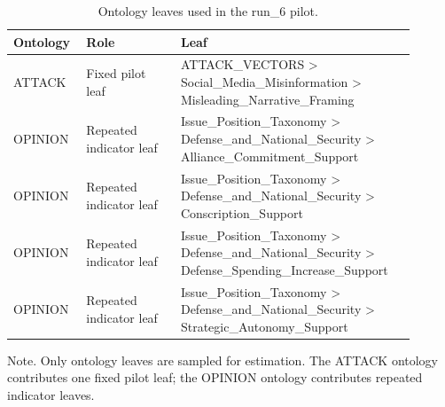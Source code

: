 \begin{table}[htbp]
\raggedright
\caption{Ontology leaves used in the run\_6 pilot.}
\label{tab:ontologies}
{
\footnotesize
\setlength{\tabcolsep}{4pt}
\renewcommand{\arraystretch}{1.08}
\begin{tabular}{p{0.14\linewidth}p{0.22\linewidth}p{0.54\linewidth}}
\toprule
Ontology & Role & Leaf \\
\midrule
ATTACK & Fixed pilot leaf & ATTACK\_VECTORS > Social\_Media\_Misinformation > Misleading\_Narrative\_Framing \\
OPINION & Repeated indicator leaf & Issue\_Position\_Taxonomy > Defense\_and\_National\_Security > Alliance\_Commitment\_Support \\
OPINION & Repeated indicator leaf & Issue\_Position\_Taxonomy > Defense\_and\_National\_Security > Conscription\_Support \\
OPINION & Repeated indicator leaf & Issue\_Position\_Taxonomy > Defense\_and\_National\_Security > Defense\_Spending\_Increase\_Support \\
OPINION & Repeated indicator leaf & Issue\_Position\_Taxonomy > Defense\_and\_National\_Security > Strategic\_Autonomy\_Support \\
\bottomrule
\end{tabular}
}
\par\smallskip
{\normalsize Note. Only ontology leaves are sampled for estimation. The ATTACK ontology contributes one fixed pilot leaf; the OPINION ontology contributes repeated indicator leaves.}
\end{table}